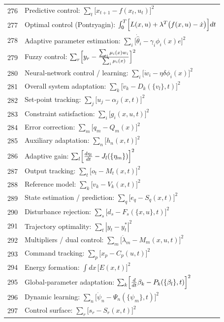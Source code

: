 \documentclass[12pt,a4paper]{article}
\begin{document}
\begin{longtable}{r l}
		276 & Predictive control: $\sum_t\bigl[x_{t+1} - f(x_t,u_t)\bigr]^2$ \\
		277 & Optimal control (Pontryagin): $\int_0^T\Bigl[L(x,u) + \lambda^T\bigl(f(x,u)-\dot x\bigr)\Bigr]dt$ \\
		278 & Adaptive parameter estimation: $\sum_i\bigl[\dot{\hat\theta}_i - \gamma_i\phi_i(x)e\bigr]^2$ \\
		279 & Fuzzy control: $\sum_r\Bigl[y_r - \frac{\sum_i\mu_i(x)w_i}{\sum_i\mu_i(x)}\Bigr]^2$ \\
		280 & Neural‑network control / learning: $\sum_i\bigl[\dot w_i - \eta\delta\phi_i(x)\bigr]^2$ \\
		281 & Overall system adaptation: $\sum_k\bigl[\dot v_k - D_k(\{v_l\},t)\Bigr]^2$ \\
		282 & Set‑point tracking: $\sum_j\bigl[u_j - \alpha_j(x,t)\Bigr]^2$ \\
		283 & Constraint satisfaction: $\sum_i\bigl[g_i(x,u,t)\bigr]^2$ \\
		284 & Error correction: $\sum_m\bigl[q_m - Q_m(x)\bigr]^2$ \\
		285 & Auxiliary adaptation: $\sum_n\bigl[h_n(x,t)\bigr]^2$ \\
		286 & Adaptive gain: $\sum_l\Bigl[\frac{d\eta_l}{dt} - J_l(\{\eta_m\})\Bigr]^2$ \\
		287 & Output tracking: $\sum_t\bigl[o_t - M_t(x,t)\Bigr]^2$ \\
		288 & Reference model: $\sum_k\bigl[v_k - V_k(x,t)\bigr]^2$ \\
		289 & State estimation / prediction: $\sum_q\bigl[e_q - S_q(x,t)\bigr]^2$ \\
		290 & Disturbance rejection: $\sum_s\bigl[d_s - F_s(\{x,u\},t)\bigr]^2$ \\
		291 & Trajectory optimality: $\sum_t|y_t - y_t^*|^2$ \\
		292 & Multipliers / dual control: $\sum_m\bigl[\dot\lambda_m - M_m(x,u,t)\bigr]^2$ \\
		293 & Command tracking: $\sum_p\bigl[x_p - C_p(u,t)\bigr]^2$ \\
		294 & Energy formation: $\int dx\,\bigl[E(x,t)\bigr]^2$ \\
		295 & Global‑parameter adaptation: $\sum_k\Bigl[\frac{d}{dt}\beta_k - P_k(\{\beta_l\},t)\Bigr]^2$ \\
		296 & Dynamic learning: $\sum_n\bigl[\dot\psi_n - \Psi_n(\{\psi_m\},t)\bigr]^2$ \\
		297 & Control surface: $\sum_r\bigl[s_r - S_r(x,t)\bigr]^2$ \\

\end{longtable}
\end{document}
